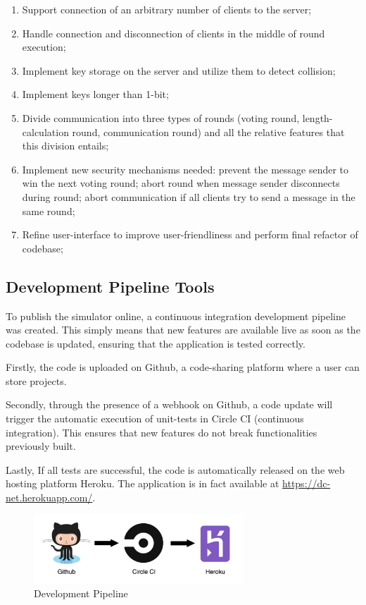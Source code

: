 \begin{enumerate}
    \item Support connection of an arbitrary number of clients to the server;
    \item Handle connection and disconnection of clients in the middle of round execution;
    \item Implement key storage on the server and utilize them to detect collision;
    \item Implement keys longer than 1-bit;
    \item Divide communication into three types of rounds (voting round, length-calculation round, communication round) and all the relative features that this division entails;
    \item Implement new security mechanisms needed: prevent the message sender to win the next voting round; abort round when message sender disconnects during round; abort communication if all clients try to send a message in the same round;
    \item Refine user-interface to improve user-friendliness and perform final refactor of codebase;
\end{enumerate}


\subsection{Development Pipeline Tools}
To publish the simulator online, a continuous integration development pipeline was created. This simply means that new features are available live as soon as the codebase is updated, ensuring that the application is tested correctly. \newline

Firstly, the code is uploaded on Github, a code-sharing platform where a user can store projects.

Secondly, through the presence of a webhook on Github, a code update will trigger the automatic execution of unit-tests in Circle CI (continuous integration). This ensures that new features do not break functionalities previously built.

Lastly, If all tests are successful, the code is automatically released on the web hosting platform Heroku. The application is in fact available at \url{https://dc-net.herokuapp.com/}.

\begin{figure}[h!]
    \centering
    \includegraphics[width=0.70\textwidth]{Images/pipeline.png}
    \caption{Development Pipeline}
    \label{fig:devPipeline}
\end{figure}

